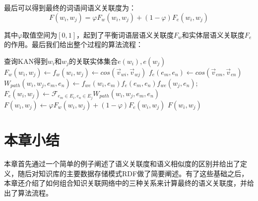 \noindent 最后可以得到最终的词语间语义关联度为：
\begin{equation}
    F(w_i, w_j) = \varphi F_w(w_i, w_j) + (1 - \varphi) F_e(w_i, w_j)
    \label{F}
\end{equation}

\noindent 其中$\varphi$取值空间为$[0,1]$，起到了平衡词语层语义关联度$F_w$和实体层语义关联度$F_e$的作用。最后我们给出整个过程的算法流程：

\begin{algorithm}
    \label{alg:kan-sr}
    \BlankLine
    查询KAN得到$w_i$和$w_j$的关联实体集合$e(w_i), e(w_j)$ \;
    $F_w(w_i, w_j) \leftarrow f_w(w_i, w_j) \leftarrow cos(\vec v_{wi},\vec v_{wj})$ \;
     {
        $f_e(e_m, e_n) \leftarrow cos(\vec v_{em},\vec v_{en})$ \;
        $W_{path}(w_i, w_j, e_m, e_n) \leftarrow f_{we}(w_i, e_m)f_e(e_m, e_n)f_{we}(w_j, e_n)$; \;
    }
    $F_e(w_i, w_j) \leftarrow \mathscr{F}_{e_m \in E_i,e_n \in E_j}W_{path}(w_i, w_j, e_m, e_n)$ \;
    $F(w_i, w_j) \leftarrow \varphi F_w(w_i, w_j) + (1 - \varphi) F_e(w_i, w_j)$ \;
    \Return $F(w_i, w_j)$
\end{algorithm}

\section{本章小结}
本章首先通过一个简单的例子阐述了语义关联度和语义相似度的区别并给出了定义，随后对知识库的主要数据存储模式RDF做了简要阐述。有了这些基础之后，本章还介绍了如何组合知识关联网络中的三种关系来计算最终的语义关联度，并给出了算法流程。
